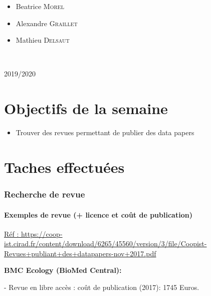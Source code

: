 \documentclass[11pt,oneside]{article}
\begin{document}
\begin{titlepage}
\begin{minipage}{0.45\textwidth}
\begin{flushright}
\begin{itemize}[font=\color{amber} \Large, label=, leftmargin=3.5cm]
\item{Beatrice \textsc{Morel}}
\item{Alexandre \textsc{Graillet}}
\item{Mathieu \textsc{Delsaut}}
\end{itemize}

\end{flushright}
\end{minipage}\\[0cm]
\vspace{10cm} 
\begin{center}
2019/2020
\end{center}
\vfill
\end{titlepage}


\newpage
\part*{Objectifs de la semaine}
\begin{itemize}
	\item Trouver des revues permettant de publier des data papers
\end{itemize}



\part*{Taches effectuées}
\section*{Recherche de revue}
\subsection*{Exemples de revue (+ licence et coût de publication)}

\begin{flushleft}
\url{Réf : https://coop-ist.cirad.fr/content/download/6265/45560/version/3/file/Coopist-Revues+publiant+des+datapapers-nov+2017.pdf}\hypersetup {colorlinks=true,linkcolor=blue,urlcolor=blue}
\end{flushleft}

\begin{flushleft}
\textbf{BMC Ecology (BioMed Central):}
\end{flushleft}

-	Revue en libre accès : coût de publication (2017): 1745 Euros.
\end{document}
